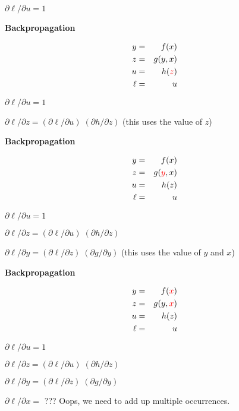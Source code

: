 \documentclass[landscape]{article}
\newcommand{\anaslide}[1]{
  \vfill
  \centerline{\Large\thepage}
  \eject \centerline{\bf #1}}
\begin{document}
{\medskip
{\color{red} ${\partial \ell}/{\partial u} = 1$}

\anaslide{Backpropagation}
\vspace{-3ex}
\begin{eqnarray*}
  y & = & f(x) \\
  z & = & g(y,x) \\
  u & = & h({\color{red} z}) \\
  \ell &  = &  u
\end{eqnarray*}

\medskip
${\partial \ell}/{\partial u} = 1$

\medskip
{\color{red} ${\partial \ell}/{\partial z} = ({\partial \ell}/{\partial u})\; ({\partial h}/{\partial z})$} (this uses the value of $z$)

\anaslide{Backpropagation}
\vspace{-3ex}
\begin{eqnarray*}
  y & = & f(x) \\
  z & = & g({\color{red} y},x) \\
  u & = & h(z) \\
  \ell &  = &  u
\end{eqnarray*}

\medskip
${\partial \ell}/{\partial u} = 1$

\medskip
${\partial \ell}/{\partial z} = ({\partial \ell}/{\partial u})\; ({\partial h}/{\partial z})$

\medskip
{\color{red} ${\partial \ell}/{\partial y} = ({\partial \ell}/{\partial z})\; ({\partial g}/{\partial y})$} (this uses the value of $y$ and $x$)

\anaslide{Backpropagation}
\vspace{-3ex}
\begin{eqnarray*}
  y & = & f({\color{red} x}) \\
  z & = & g(y,{\color{red} x}) \\
  u & = & h(z) \\
  \ell &  = &  u
\end{eqnarray*}

\medskip
${\partial \ell}/{\partial u} = 1$

\medskip
${\partial \ell}/{\partial z} = ({\partial \ell}/{\partial u})\; ({\partial h}/{\partial z})$

\medskip
${\partial \ell}/{\partial y} = ({\partial \ell}/{\partial z})\; ({\partial g}/{\partial y})$

\medskip
{\color{red} ${\partial \ell}/{\partial x} =$ ???} Oops, we need to add up multiple occurrences.

}
\end{document}
